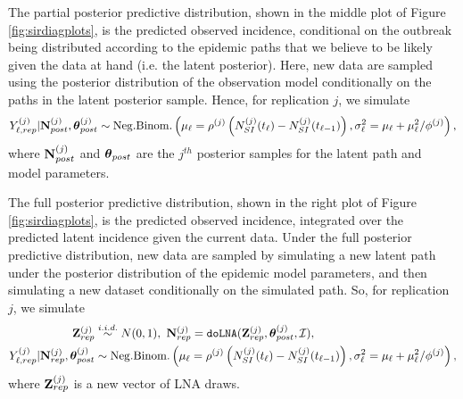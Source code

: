 The partial posterior predictive distribution, shown in the middle plot of Figure \ref{fig:sirdiagplots}, is the predicted observed incidence, conditional on the outbreak being distributed according to the epidemic paths that we believe to be likely given the data at hand (i.e. the latent posterior). Here, new data are sampled using the posterior distribution of the observation model conditionally on the paths in the latent posterior sample. Hence, for replication $ j $, we simulate \begin{equation}
\label{eqn:lna_partial_postpred}
Y_{\ell,rep}^{(j)}|\mathbf{N}_{post}^{(j)},\boldsymbol{\theta}_{post}^{(j)} \sim \mathrm{Neg.Binom.}\left (\mu_\ell = \rho^{(j)}\left (N_{SI}^{(j)}(t_\ell) - N_{SI}^{(j)}(t_{\ell-1})\right ),\sigma^2_\ell = \mu_\ell + \mu_\ell^2 / \phi^{(j)} \right ),
\end{equation} 
where $ \mathbf{N}_{post}^{(j)} $ and $ \boldsymbol{\theta}_{post} $ are the $ j^{th} $ posterior samples for the latent path and model parameters. 

The full posterior predictive distribution, shown in the right plot of Figure \ref{fig:sirdiagplots}, is the predicted observed incidence, integrated over the predicted latent incidence given the current data. Under the full posterior predictive distribution, new data are sampled by simulating a new latent path under the posterior distribution of the epidemic model parameters, and then simulating a new dataset conditionally on the simulated path. So, for replication $ j $, we simulate \begin{align}
\label{eqn:lna_full_postpred}
\mathbf{Z}^{(j)}_{rep} &\overset{i.i.d.}{\sim} N(0,1),\ \mathbf{N}^{(j)}_{rep} = \texttt{doLNA}(\mathbf{Z}^{(j)}_{rep},\boldsymbol{\theta}_{post}^{(j)},\mathcal{I}), \\ 
Y_{\ell,rep}^{(j)}|\mathbf{N}_{rep}^{(j)},\boldsymbol{\theta}_{post}^{(j)} &\sim \mathrm{Neg.Binom.}\left (\mu_\ell = \rho^{(j)}\left (N_{SI}^{(j)}(t_\ell) - N_{SI}^{(j)}(t_{\ell-1})\right ),\sigma^2_\ell = \mu_\ell + \mu_\ell^2 / \phi^{(j)} \right ),
\end{align} 
where $ \mathbf{Z}_{rep}^{(j)} $ is a new vector of LNA draws. 

